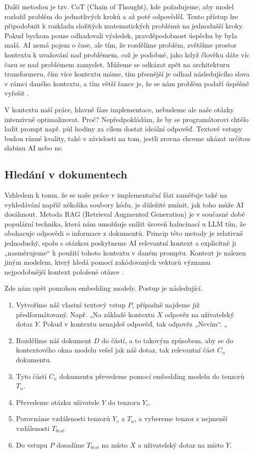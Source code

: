 \documentclass[FM,DP]{tulthesis}
\begin{document}
		Další metodou je tzv. CoT (Chain of Thought), kde požadujeme, aby model rozložil problém do jednotlivých kroků a až poté odpověděl. Tento přístup lze připodobnit k rozkladu složitých matematických problémů na jednodušší kroky. Pokud bychom pouze odhadovali výsledek, pravděpodobnost úspěchu by byla malá. AI nemá pojem o čase, ale tím, že rozdělíme problém, zvětšíme prostor kontextu k uvažování nad problémem, což je podobné, jako když člověku dáte víc času se nad problémem zamyslet. Můžeme se odkázat zpět na architekturu transformeru, čím více kontextu máme, tím přesnější je odhad následujícího slova v rámci daného kontextu, a tím větší šance je, že se nám problém podaří úspěšně vyřešit \cite{PEG}.
		
		V kontextu naší práce, hlavně fáze implementace, nebudeme ale naše otázky intenzivně optimalizovat. Proč? Nepředpokládám, že by se programátorovi chtělo ladit prompt např. půl hodiny za cílem dostat ideální odpověď. Textové vstupy budou různé kvality, také v závislosti na tom, jestli zrovna chceme ukázat určitou slabinu AI nebo ne. 
		
		\subsection{Hledání v dokumentech}
		Vzhledem k tomu, že se naše práce v implementační fázi zaměřuje také na vyhledávání napříč několika soubory kódu, je důležité zmínit, jak toho může AI dosáhnout. Metoda RAG (Retrieval Augmented Generation) je v současné době populární technika, která nám umožňuje snížit úroveň halucinací u LLM tím, že obohacuje odpovědi o informace z dokumentů. Princip této metody je relativně jednoduchý, spolu s otázkou poskytneme AI relevantní kontext a explicitně ji „nasměrujeme“ k použití tohoto kontextu v daném promptu. Kontext je nalezen jiným modelem, který hledá pomocí zakódovaných vektorů významu nejpodobnější kontext položené otázce \cite{paper:RAG}.
		
		Zde nám opět pomohou embedding modely. Postup je následující.
		\begin{enumerate}
			\item Vytvoříme náš vlastní textový vstup $P$, případně najdeme již předformátovaný. Např. „Na základě kontextu $X$ odpověz na uživatelský dotaz $Y$. Pokud v kontextu nenajdeš odpověď, tak odpověz „Nevím“. „
			\item Rozdělíme náš dokument $D$ do částí, a to takovým způsobem, aby se do kontextového okna modelu vešel jak náš dotaz, tak relevantní část $C_n$ dokumentu.
			\item Tyto části $C_n$ dokumentu převedeme pomocí embedding modelu do tenzorů $T_n$.
			\item Převedeme otázku uživatele $Y$ do tenzoru $Y_v$.
			\item Porovnáme vzdálenosti tenzorů $Y_v$ a $T_n$, a vybereme tenzor s nejmenší vzdálenosti $T_{best}$. 
			\item Do vstupu $P$ dosadíme $T_{best}$ na místo $X$ a uživatelský dotaz na místo $Y$.
		\end{enumerate}
		
\end{document}
